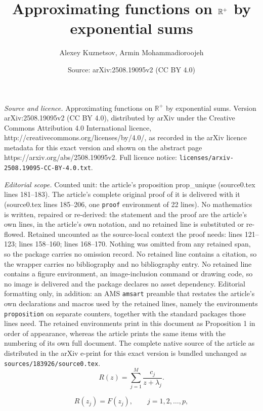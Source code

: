 \documentclass[10pt,a4paper]{amsart}
\title{Approximating functions on $\r^+$ by exponential sums}
\author{Alexey Kuznetsov, Armin Mohammadioroojeh}
\date{Source: arXiv:2508.19095v2 (CC BY 4.0)}
\def\r{{\mathbb R}}
\begin{document}
\maketitle

\noindent\emph{Source and licence.} Approximating functions on $\r^+$ by exponential sums. Version arXiv:2508.19095v2 (CC BY 4.0), distributed by arXiv under the Creative Commons Attribution 4.0 International licence, http://creativecommons.org/licenses/by/4.0/, as recorded in the arXiv licence metadata for this exact version and shown on the abstract page https://arxiv.org/abs/2508.19095v2. Full licence notice: \texttt{licenses/arxiv-2508.19095-CC-BY-4.0.txt}.\par\smallskip

\noindent\textit{Editorial scope.} Counted unit: the article's proposition prop\_unique (source0.tex lines 181--183). The article's complete original proof of it is delivered with it (source0.tex lines 185--206, one \texttt{proof} environment of 22 lines). No mathematics is written, repaired or re-derived: the statement and the proof are the article's own lines, in the article's own notation, and no retained line is substituted or re-flowed.  Retained uncounted as the source-local context the proof needs: lines 121--123; lines 158--160; lines 168--170.  Nothing was omitted from any retained span, so the package carries no omission record.  No retained line contains a citation, so the wrapper carries no bibliography and no bibliography entry.  No retained line contains a figure environment, an image-inclusion command or drawing code, so no image is delivered and the package declares no asset dependency.  Editorial formatting only, in addition: an AMS \texttt{amsart} preamble that restates the article's own declarations and macros used by the retained lines, namely the environments \texttt{proposition} on separate counters, together with the standard packages those lines need.  The retained environments print in this document as Proposition 1 in order of appearance, whereas the article prints the same items with the numbering of its own full document.  The complete native source of the article as distributed in the arXiv e-print for this exact version is bundled unchanged as \texttt{sources/183926/source0.tex}.
\begin{equation}\label{eqn:Phi_partial_fraction}
R(z)=\sum_{j=1}^M \frac{c_j}{z+\lambda_j}.
\end{equation}

\begin{equation}\label{eqn:Phi_at_z_j}
R(z_j)=F(z_j), \qquad j=1,2,\dots,p, 
\end{equation}
\end{document}
